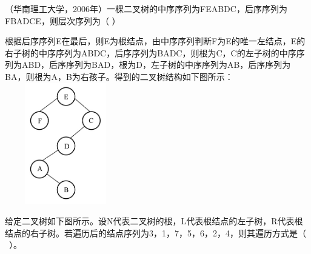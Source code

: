 \question （华南理工大学，2006年）一棵二叉树的中序序列为FEABDC，后序序列为FBADCE，则层次序列为（
）
\par{}
\begin{solution}根据后序序列E在最后，则E为根结点，由中序序列判断F为E的唯一左结点，E的右子树的中序序列为ABDC，后序序列为BADC，则根为C，C的左子树的中序序列为ABD，后序序列为BAD，根为D，左子树的中序序列为AB，后序序列为BA，则根为A，B为右孩子。得到的二叉树结构如下图所示：
\includegraphics[width=2.08333in,height=2.08333in]{computerassets/b6adf4b2fc3f392b6f1c076f3cde5135.jpeg}
\end{solution}
\question 给定二叉树如下图所示。设N代表二叉树的根，L代表根结点的左子树，R代表根结点的右子树。若遍历后的结点序列为3，1，7，5，6，2，4，则其遍历方式是（
~）。

